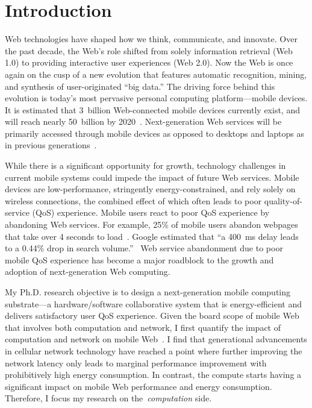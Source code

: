 \chapter{Introduction}
%


Web technologies have shaped how we think, communicate, and innovate. Over the past decade, the Web's role shifted from solely information retrieval (Web 1.0) to providing interactive user experiences (Web 2.0). Now the Web is once again on the cusp of a new evolution that features automatic recognition, mining, and synthesis of user-originated ``big data.'' The driving force behind this evolution is today's most pervasive personal computing platform---mobile devices. It is estimated that 3~billion Web-connected mobile devices currently exist, and will reach nearly 50~billion by 2020~\cite{Evans:2011ys}.  Next-generation Web services will be primarily accessed through mobile devices as opposed to desktops and laptops as in previous generations~\cite{KPCB-Internet-Trends15}.

While there is a significant opportunity for growth, technology challenges in current mobile systems could impede the impact of future Web services. Mobile devices are low-performance, stringently energy-constrained, and rely solely on wireless connections, the combined effect of which often leads to poor quality-of-service (QoS) experience. Mobile users react to poor QoS experience by abandoning Web services. For example, 25\% of mobile users abandon webpages that take over 4 seconds to load~\cite{web:kiss}. Google estimated that ``a 400~ms delay leads to a 0.44\% drop in search volume.''~\cite{web:google} Web service abandonment due to poor mobile QoS experience has become a major roadblock to the growth and adoption of next-generation Web computing.

My Ph.D. research objective is to design a next-generation mobile computing substrate---a hardware/software collaborative system that is energy-efficient and delivers satisfactory user QoS experience. Given the board scope of mobile Web that involves both computation and network, I first quantify the impact of computation and network on mobile Web~\cite{zhu2015role}. I find that generational advancements in cellular network technology have reached a point where further improving the network latency only leads to marginal performance improvement with prohibitively high energy consumption. In contrast, the compute starts having a significant impact on mobile Web performance and energy consumption. Therefore, I focus my research on the~\textit{computation} side.

